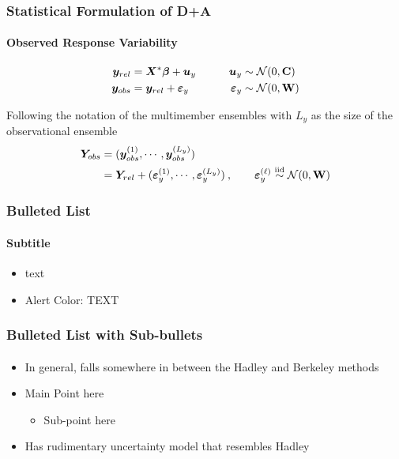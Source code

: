 \documentclass{beamer}
\newcommand{\C}{\ensuremath{\text{Cov}}}
\newcommand{\iid}{\ensuremath{\stackrel{\text{iid}}{\sim}}}
\def\*#1{\bm{#1}}
\def\C{\textbf{\text{C}}}
\def\W{\textbf{\text{W}}}
\begin{document}
\begin{frame}
\frametitle{Statistical Formulation of D+A}
\framesubtitle{Observed Response Variability}

\begin{exampleblock}{}
\vspace*{-\baselineskip}\setlength\belowdisplayshortskip{0pt}
\begin{alignat*}{3}
\*y_{rel} &= \*X^* \*\beta + \*u_y \nonumber  \qquad  &\*u_y &\sim \mathcal N(0,\C) \\
\*y_{obs} &= \*y_{rel} + \*\varepsilon_y &\*\varepsilon_y &\sim \mathcal N(0,\W)
\end{alignat*}
\end{exampleblock}

 Following the notation of the multimember ensembles with $L_y$ as the size of the observational ensemble
\begin{align*}
\*Y_{obs} &= ( \*y_{obs}^{(1)}, \cdots,  \*y_{obs}^{(L_y)}) \\
 &=  \*Y_{rel} + (  \*\varepsilon_y^{(1)}, \cdots,   \*\varepsilon_y^{(L_y)}) \: , \qquad \*\varepsilon_y^{(\ell)} \iid \mathcal N(0,\W) \\
\end{align*}

\end{frame}

























\begin{frame}
\frametitle{Bulleted List}
  \framesubtitle{Subtitle}
  \begin{itemize}
  \item {} text
  \item \alert{Alert Color:} TEXT
  \end{itemize}  
\end{frame}


\begin{frame}
  \frametitle{Bulleted List with Sub-bullets}
  \framesubtitle{}
  \begin{itemize}
  \item In general, falls somewhere in between the Hadley and Berkeley methods 
  \item Main Point here
  \begin{itemize}
  \item Sub-point here
  \end{itemize}
  \item Has rudimentary uncertainty model that resembles Hadley
  \end{itemize}
\end{frame}
\end{document}
